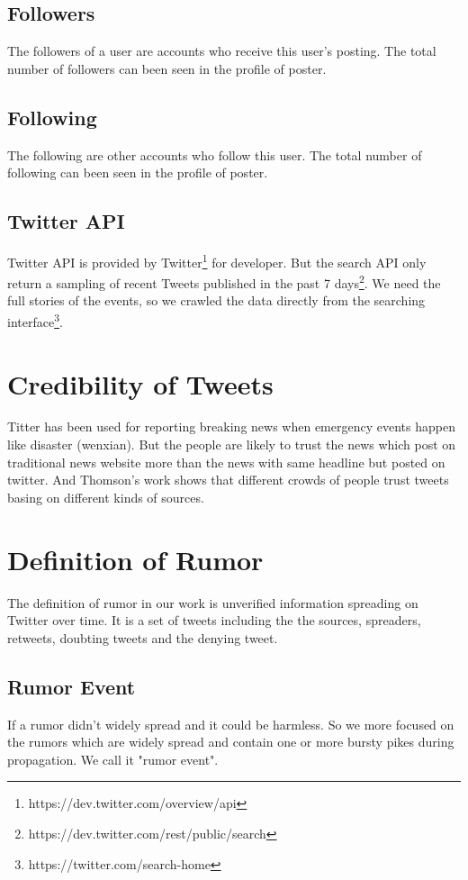 \subsection{Followers}
The followers of a user are accounts who receive this user's posting. The total number of followers can been seen in the profile of poster.
\subsection{Following}
The following are other accounts who follow this user. The total number of following can been seen in the profile of poster.
\subsection{Twitter API}
Twitter API is provided by Twitter\footnote{https://dev.twitter.com/overview/api} for developer. But the search API only return a sampling of recent Tweets published in the past 7 days\footnote{https://dev.twitter.com/rest/public/search}. We need the full stories of the events, so we crawled the data directly from the searching interface\footnote{https://twitter.com/search-home}.
\section{Credibility of Tweets } %
Titter has been used for reporting breaking news when emergency events happen like disaster (wenxian). But the people are likely to trust the news which post on traditional news website more than the news with same headline but posted on twitter. And Thomson's work shows that different crowds of people trust tweets basing on different kinds of sources\cite{thomson2012trusting}.

 \section{Definition of Rumor}
 The definition of rumor in our work is unverified information spreading on Twitter over time. It is a set of tweets including the the sources, spreaders, retweets, doubting  tweets and the denying tweet. 
 \subsection{Rumor Event}
 If a rumor didn't widely spread and it could be harmless. So we more focused on the rumors which are widely spread and contain one or more bursty pikes during propagation. We call it "rumor event".

